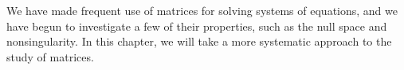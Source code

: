 \begin{para}We have made frequent use of matrices for solving systems of equations, and we have begun to investigate a few of their properties, such as the null space and nonsingularity.  In this chapter, we will take a more systematic approach to the study of matrices.\end{para}